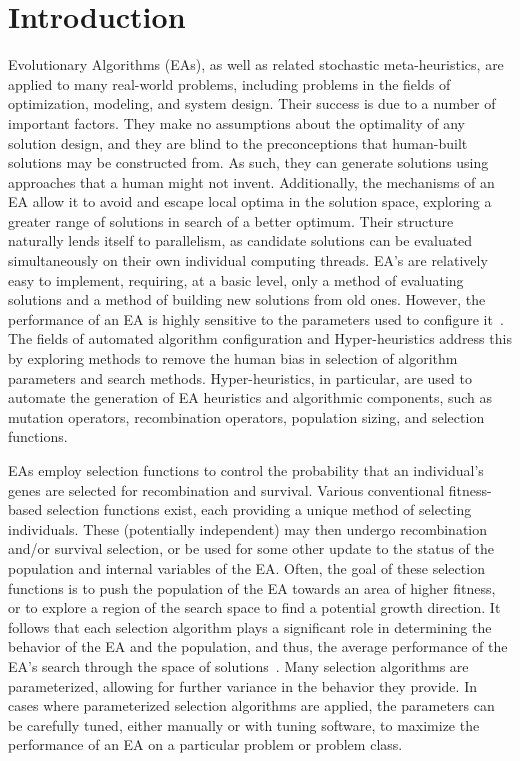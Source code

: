 \documentclass[sigconf]{acmart}
\begin{document}
\section{Introduction}
\label{Introduction}
Evolutionary Algorithms (EAs), as well as related stochastic meta-heuristics, are applied to many real-world problems, including problems in the fields of optimization, modeling, and system design. Their success is due to a number of important factors. They make no assumptions about the optimality of any solution design, and they are blind to the preconceptions that human-built solutions may be constructed from. As such, they can generate solutions using approaches that a human might not invent. Additionally, the mechanisms of an EA allow it to avoid and escape local optima in the solution space, exploring a greater range of solutions in search of a better optimum. Their structure naturally lends itself to parallelism, as candidate solutions can be evaluated simultaneously on their own individual computing threads. EA's are relatively easy to implement, requiring, at a basic level, only a method of evaluating solutions and a method of building new solutions from old ones. However, the performance of an EA is highly sensitive to the parameters used to configure it~\citep{eiben1999parameter}. The fields of automated algorithm configuration and Hyper-heuristics address this by exploring methods to remove the human bias in selection of algorithm parameters and search methods. Hyper-heuristics, in particular, are used to automate the generation of EA heuristics and algorithmic components, such as mutation operators, recombination operators, population sizing, and selection functions.

EAs employ selection functions to control the probability that an individual's genes are selected for recombination and survival. Various conventional fitness-based selection functions exist, each providing a unique method of selecting individuals. These (potentially independent) may then undergo recombination and/or survival selection, or be used for some other update to the status of the population and internal variables of the EA. Often, the goal of these selection functions is to push the population of the EA towards an area of higher fitness, or to explore a region of the search space to find a potential growth direction. It follows that each selection algorithm plays a significant role in determining the behavior of the EA and the population, and thus, the average performance of the EA's search through the space of solutions~\citep{woodward2010metaBias}. Many selection algorithms are parameterized, allowing for further variance in the behavior they provide. In cases where parameterized selection algorithms are applied, the parameters can be carefully tuned, either manually or with tuning software, to maximize the performance of an EA on a particular problem or problem class.
\end{document}
